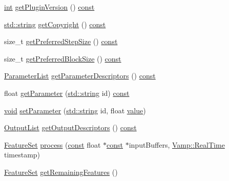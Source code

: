 \begin{DoxyCompactItemize}
\item 
\hyperlink{xmltok_8h_a5a0d4a5641ce434f1d23533f2b2e6653}{int} \hyperlink{class_percussion_onset_detector_ad6b818dbd81867ce7be71c99cae861be}{get\+Plugin\+Version} () \hyperlink{getopt1_8c_a2c212835823e3c54a8ab6d95c652660e}{const} 
\item 
\hyperlink{test__lib_f_l_a_c_2format_8c_ab02026ad0de9fb6c1b4233deb0a00c75}{std\+::string} \hyperlink{class_percussion_onset_detector_a1a22ece271330c94cc08798a77416351}{get\+Copyright} () \hyperlink{getopt1_8c_a2c212835823e3c54a8ab6d95c652660e}{const} 
\item 
size\+\_\+t \hyperlink{class_percussion_onset_detector_a733824891e11c306a7a678534b89b968}{get\+Preferred\+Step\+Size} () \hyperlink{getopt1_8c_a2c212835823e3c54a8ab6d95c652660e}{const} 
\item 
size\+\_\+t \hyperlink{class_percussion_onset_detector_a410c0b47c6c849d7ed9b726b84402ad0}{get\+Preferred\+Block\+Size} () \hyperlink{getopt1_8c_a2c212835823e3c54a8ab6d95c652660e}{const} 
\item 
\hyperlink{class_vamp_1_1_plugin_base_a3b6bb4bbd86affe1ca9deceea1aad4f8}{Parameter\+List} \hyperlink{class_percussion_onset_detector_abceae88cc9762b0ea310d7aad71de815}{get\+Parameter\+Descriptors} () \hyperlink{getopt1_8c_a2c212835823e3c54a8ab6d95c652660e}{const} 
\item 
float \hyperlink{class_percussion_onset_detector_a9b28da8315fcde46ce7644d6592ba527}{get\+Parameter} (\hyperlink{test__lib_f_l_a_c_2format_8c_ab02026ad0de9fb6c1b4233deb0a00c75}{std\+::string} id) \hyperlink{getopt1_8c_a2c212835823e3c54a8ab6d95c652660e}{const} 
\item 
\hyperlink{sound_8c_ae35f5844602719cf66324f4de2a658b3}{void} \hyperlink{class_percussion_onset_detector_aa097d72488e1211f05fc661ff5c6dc01}{set\+Parameter} (\hyperlink{test__lib_f_l_a_c_2format_8c_ab02026ad0de9fb6c1b4233deb0a00c75}{std\+::string} id, float \hyperlink{lib_2expat_8h_a4a30a13b813682e68c5b689b45c65971}{value})
\item 
\hyperlink{class_vamp_1_1_plugin_a30f531b8fb69fac41a24e3d2a6a08ed9}{Output\+List} \hyperlink{class_percussion_onset_detector_aa4537aa0eb58a67d6e824d46924cf782}{get\+Output\+Descriptors} () \hyperlink{getopt1_8c_a2c212835823e3c54a8ab6d95c652660e}{const} 
\item 
\hyperlink{class_vamp_1_1_plugin_a448fb57dc245d47923ec9eeaf9856c5f}{Feature\+Set} \hyperlink{class_percussion_onset_detector_adfd989812b3e0cb8f4b498f56a5a9614}{process} (\hyperlink{getopt1_8c_a2c212835823e3c54a8ab6d95c652660e}{const} float $\ast$\hyperlink{getopt1_8c_a2c212835823e3c54a8ab6d95c652660e}{const} $\ast$input\+Buffers, \hyperlink{struct_vamp_1_1_real_time}{Vamp\+::\+Real\+Time} timestamp)
\item 
\hyperlink{class_vamp_1_1_plugin_a448fb57dc245d47923ec9eeaf9856c5f}{Feature\+Set} \hyperlink{class_percussion_onset_detector_ad3d6767ed137783e84f842b4d4732ffa}{get\+Remaining\+Features} ()
\end{DoxyCompactItemize}
